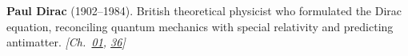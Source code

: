 \nobelphysics \textbf{Paul Dirac} (1902–1984). British theoretical physicist who formulated the Dirac equation, reconciling quantum mechanics with special relativity and predicting antimatter. \emph{[Ch.~\hyperref[ch:goldrelativity]{01}, \hyperref[ch:qftvsgr]{36}]}

